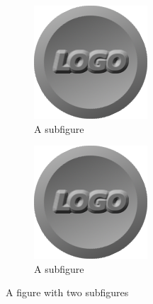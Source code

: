 \documentclass[a4paper,11pt]{article}
\begin{document}
\begin{figure}
\centering
\begin{subfigure}{.5\textwidth}
  \centering
  \includegraphics[width=.4\linewidth]{images/logo.png}
  \caption{A subfigure}
  \label{fig:sub1}
\end{subfigure}%
\begin{subfigure}{.5\textwidth}
  \centering
  \includegraphics[width=.4\linewidth]{images/logo.png}
  \caption{A subfigure}
  \label{fig:sub2}
\end{subfigure}
\caption{A figure with two subfigures}
\label{fig:test}
\end{figure}
\end{document}
